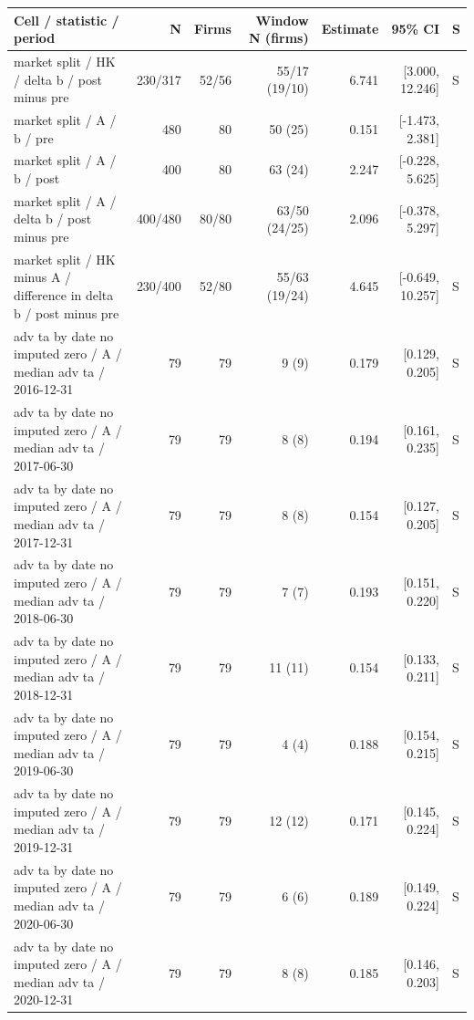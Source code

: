 \begin{threeparttable}
\begin{tabular}{p{5.7cm}rrrrrl}
\toprule
Cell / statistic / period & N & Firms & Window N (firms) & Estimate & 95\% CI & S \\
\midrule
market split / HK / delta b / post minus pre & 230/317 & 52/56 & 55/17 (19/10) & 6.741 & [3.000, 12.246] & S \\
market split / A / b / pre & 480 & 80 & 50 (25) & 0.151 & [-1.473, 2.381] &  \\
market split / A / b / post & 400 & 80 & 63 (24) & 2.247 & [-0.228, 5.625] &  \\
market split / A / delta b / post minus pre & 400/480 & 80/80 & 63/50 (24/25) & 2.096 & [-0.378, 5.297] &  \\
market split / HK minus A / difference in delta b / post minus pre & 230/400 & 52/80 & 55/63 (19/24) & 4.645 & [-0.649, 10.257] & S \\
adv ta by date no imputed zero / A / median adv ta / 2016-12-31 & 79 & 79 & 9 (9) & 0.179 & [0.129, 0.205] & S \\
adv ta by date no imputed zero / A / median adv ta / 2017-06-30 & 79 & 79 & 8 (8) & 0.194 & [0.161, 0.235] & S \\
adv ta by date no imputed zero / A / median adv ta / 2017-12-31 & 79 & 79 & 8 (8) & 0.154 & [0.127, 0.205] & S \\
adv ta by date no imputed zero / A / median adv ta / 2018-06-30 & 79 & 79 & 7 (7) & 0.193 & [0.151, 0.220] & S \\
adv ta by date no imputed zero / A / median adv ta / 2018-12-31 & 79 & 79 & 11 (11) & 0.154 & [0.133, 0.211] & S \\
adv ta by date no imputed zero / A / median adv ta / 2019-06-30 & 79 & 79 & 4 (4) & 0.188 & [0.154, 0.215] & S \\
adv ta by date no imputed zero / A / median adv ta / 2019-12-31 & 79 & 79 & 12 (12) & 0.171 & [0.145, 0.224] & S \\
adv ta by date no imputed zero / A / median adv ta / 2020-06-30 & 79 & 79 & 6 (6) & 0.189 & [0.149, 0.224] & S \\
adv ta by date no imputed zero / A / median adv ta / 2020-12-31 & 79 & 79 & 8 (8) & 0.185 & [0.146, 0.203] & S \\
\bottomrule
\end{tabular}
\begin{tablenotes}[flushleft]\footnotesize

\end{tablenotes}
\end{threeparttable}
